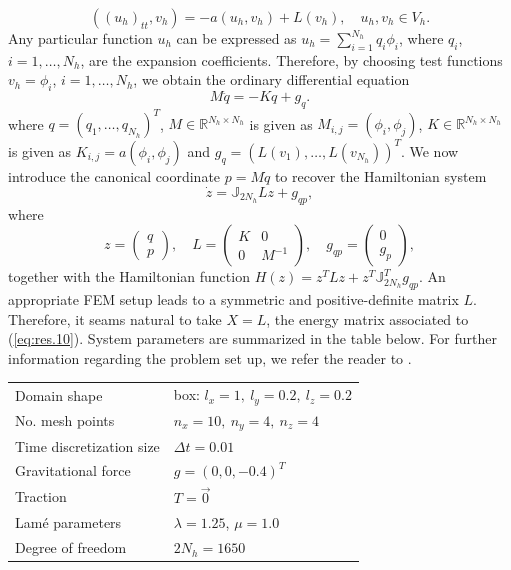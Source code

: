 \begin{equation} \label{eq:res.8}
	((u_h)_{tt},v_h) = - a(u_h,v_h) + L(v_h),\quad u_h,v_h\in V_h.
\end{equation}
Any particular function $u_h$ can be expressed as $u_h = \sum_{i=1}^{N_h} q_i \phi_i$, where $q_i$, $i=1,\dots,N_h$, are the expansion coefficients. Therefore, by choosing test functions $v_h = \phi_i$, $i=1,\dots,N_h$, we obtain the ordinary differential equation
\begin{equation} \label{eq:res.9}
	M\ddot q = -K q + g_{q}.
\end{equation}
where $q=(q_1,\dots,q_{N_h})^T$, $M\in \mathbb R^{N_h\times N_h}$ is given as $M_{i,j} = (\phi_i,\phi_j)$, $K\in \mathbb R^{N_h\times N_h}$ is given as $K_{i,j} = a(\phi_i,\phi_j)$ and $g_q=(L(v_1),\dots,L(v_{N_h}))^T$. We now introduce the canonical coordinate $p = M\dot q$ to recover the Hamiltonian system
\begin{equation} \label{eq:res.10}
	\dot z = \mathbb J_{2N_h} Lz + g_{qp},
\end{equation}
where
\begin{equation} \label{eq:res.11}
	z = 
	\begin{pmatrix}
	q \\
	p	
	\end{pmatrix}, \quad 
	L = 
	\begin{pmatrix}
	K & 0 \\
	0 & M^{-1}
	\end{pmatrix}, \quad
	g_{qp} =
	\begin{pmatrix}
	0 \\
	g_p
	\end{pmatrix},
\end{equation}
together with the Hamiltonian function $H(z) = z^TLz + z^T \mathbb J_{2N_h}^T g_{qp}$. An appropriate FEM setup leads to a symmetric and positive-definite matrix $L$. Therefore, it seams natural to take $X=L$, the energy matrix associated to (\ref{eq:res.10}). System parameters are summarized in the table below. For further information regarding the problem set up, we refer the reader to \cite{langtangen2017solving}.

\vspace{0.5cm}
\begin{center}
\begin{tabular}{|l|l|}
\hline
Domain shape & box: $l_x = 1,\ l_y = 0.2,\ l_z = 0.2$ \\
No. mesh points & $n_x = 10,\ n_y = 4,\ n_z = 4$ \\
Time discretization size & $\Delta t = 0.01$ \\
Gravitational force & $g = (0,0,-0.4)^T$ \\
Traction & $T = \vec 0$ \\
Lam\'e parameters & $\lambda = 1.25$, $\mu = 1.0$ \\
Degree of freedom & $2N_{h} = 1650$ \\
\hline
\end{tabular}
\end{center}
\vspace{0.5cm}

